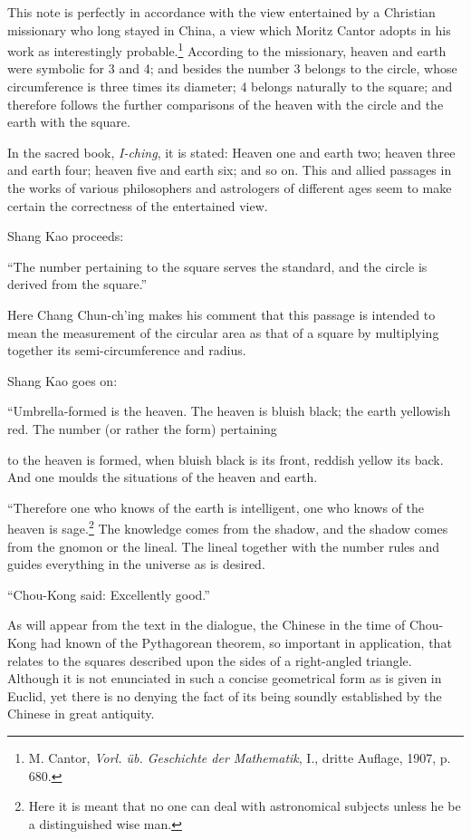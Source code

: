 \documentclass[11pt]{article}
\newcommand{\scanpage}[2]{\clearpage\setcounter{footnote}{0}\noindent{\footnotesize\color{gray}PDF page #1 · #2}\par\medskip}
\newcommand{\scanfooter}{}
\begin{document}
This note is perfectly in accordance with the view entertained by a Christian missionary who long stayed in China, a view which Moritz Cantor adopts in his work as interestingly probable.\footnote{M. Cantor, \emph{Vorl. üb. Geschichte der Mathematik}, I., dritte Auflage, 1907, p. 680.} According to the missionary, heaven and earth were symbolic for 3 and 4; and besides the number 3 belongs to the circle, whose circumference is three times its diameter; 4 belongs naturally to the square; and therefore follows the further comparisons of the heaven with the circle and the earth with the square.

In the sacred book, \emph{I-ching}, it is stated: Heaven one and earth two; heaven three and earth four; heaven five and earth six; and so on. This and allied passages in the works of various philosophers and astrologers of different ages seem to make certain the correctness of the entertained view.

Shang Kao proceeds:

``The number pertaining to the square serves the standard, and the circle is derived from the square.''

Here Chang Chun-ch'ing makes his comment that this passage is intended to mean the measurement of the circular area as that of a square by multiplying together its semi-circumference and radius.

Shang Kao goes on:

``Umbrella-formed is the heaven. The heaven is bluish black; the earth yellowish red. The number (or rather the form) pertaining
\scanfooter

\scanpage{0021}{Chapter 2, printed page 7}
\setcounter{footnote}{0}
to the heaven is formed, when bluish black is its front, reddish yellow its back. And one moulds the situations of the heaven and earth.

``Therefore one who knows of the earth is intelligent, one who knows of the heaven is sage.\footnote{Here it is meant that no one can deal with astronomical subjects unless he be a distinguished wise man.} The knowledge comes from the shadow, and the shadow comes from the gnomon or the lineal. The lineal together with the number rules and guides everything in the universe as is desired.

``Chou-Kong said: Excellently good.''

As will appear from the text in the dialogue, the Chinese in the time of Chou-Kong had known of the Pythagorean theorem, so important in application, that relates to the squares described upon the sides of a right-angled triangle. Although it is not enunciated in such a concise geometrical form as is given in Euclid, yet there is no denying the fact of its being soundly established by the Chinese in great antiquity.
\end{document}

